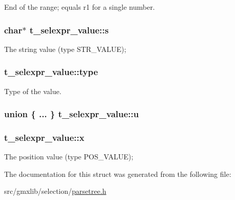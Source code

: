 \-End of the range; equals {\ttfamily r1} for a single number. \hypertarget{structt__selexpr__value_a4b5ef242753f905c05472be5cd80f2a9}{
\subsubsection[{s}]{\setlength{\rightskip}{0pt plus 5cm}char$\ast$ {\bf t\-\_\-selexpr\-\_\-value\-::s}}}\label{structt__selexpr__value_a4b5ef242753f905c05472be5cd80f2a9}
\-The string value ({\ttfamily type} \-S\-T\-R\-\_\-\-V\-A\-L\-U\-E); \hypertarget{structt__selexpr__value_a04bb5634ea528c40b60aabdf39548897}{
\subsubsection[{type}]{ {\bf t\-\_\-selexpr\-\_\-value\-::type}}}\label{structt__selexpr__value_a04bb5634ea528c40b60aabdf39548897}
\-Type of the value. \hypertarget{structt__selexpr__value_ab67366fc205b4c84266d134a8189ca91}{
\subsubsection[{u}]{\setlength{\rightskip}{0pt plus 5cm}union \{ ... \}                         {\bf t\-\_\-selexpr\-\_\-value\-::u}}}\label{structt__selexpr__value_ab67366fc205b4c84266d134a8189ca91}
\hypertarget{structt__selexpr__value_a029f7f0c2e6e293387f6b287716a0c81}{
\subsubsection[{x}]{ {\bf t\-\_\-selexpr\-\_\-value\-::x}}}\label{structt__selexpr__value_a029f7f0c2e6e293387f6b287716a0c81}
\-The position value ({\ttfamily type} \-P\-O\-S\-\_\-\-V\-A\-L\-U\-E); 

\-The documentation for this struct was generated from the following file\-:\begin{DoxyCompactItemize}
\item 
src/gmxlib/selection/\hyperlink{parsetree_8h}{parsetree.\-h}\end{DoxyCompactItemize}
